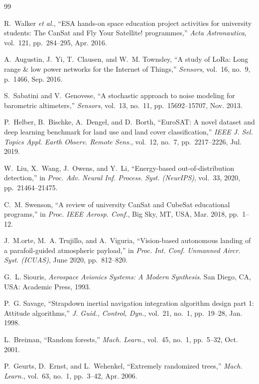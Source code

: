 \documentclass[conference]{IEEEtran}
\begin{document}
\begin{thebibliography}{99}

R.~Walker \emph{et al.}, ``ESA hands-on space education project activities for university students: The CanSat and Fly Your Satellite! programmes,'' \emph{Acta Astronautica}, vol.~121, pp.~284--295, Apr. 2016.

A.~Augustin, J.~Yi, T.~Clausen, and W.~M. Townsley, ``A study of LoRa: Long range \& low power networks for the Internet of Things,'' \emph{Sensors}, vol.~16, no.~9, p.~1466, Sep. 2016.

S.~Sabatini and V.~Genovese, ``A stochastic approach to noise modeling for barometric altimeters,'' \emph{Sensors}, vol.~13, no.~11, pp.~15692--15707, Nov. 2013.

P.~Helber, B.~Bischke, A.~Dengel, and D.~Borth, ``EuroSAT: A novel dataset and deep learning benchmark for land use and land cover classification,'' \emph{IEEE J. Sel. Topics Appl. Earth Observ. Remote Sens.}, vol.~12, no.~7, pp.~2217--2226, Jul. 2019.

W.~Liu, X.~Wang, J.~Owens, and Y.~Li, ``Energy-based out-of-distribution detection,'' in \emph{Proc. Adv. Neural Inf. Process. Syst. (NeurIPS)}, vol.~33, 2020, pp.~21464--21475.

C.~M. Swenson, ``A review of university CanSat and CubeSat educational programs,'' in \emph{Proc. IEEE Aerosp. Conf.}, Big Sky, MT, USA, Mar. 2018, pp.~1--12.

J.~M.orte, M.~A. Trujillo, and A.~Viguria, ``Vision-based autonomous landing of a parafoil-guided atmospheric payload,'' in \emph{Proc. Int. Conf. Unmanned Aircr. Syst. (ICUAS)}, June 2020, pp.~812--820.

G.~L. Siouris, \emph{Aerospace Avionics Systems: A Modern Synthesis}. San Diego, CA, USA: Academic Press, 1993.

P.~G. Savage, ``Strapdown inertial navigation integration algorithm design part 1: Attitude algorithms,'' \emph{J. Guid., Control, Dyn.}, vol.~21, no.~1, pp.~19--28, Jan. 1998.

L.~Breiman, ``Random forests,'' \emph{Mach. Learn.}, vol.~45, no.~1, pp.~5--32, Oct. 2001.

P.~Geurts, D.~Ernst, and L.~Wehenkel, ``Extremely randomized trees,'' \emph{Mach. Learn.}, vol.~63, no.~1, pp.~3--42, Apr. 2006.


\end{thebibliography}
\end{document}
